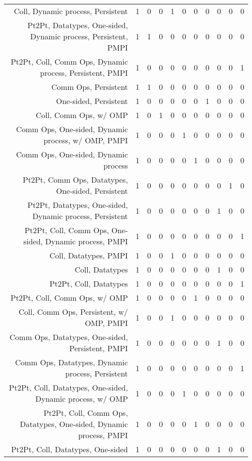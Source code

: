 {\begin{landscape}
\begin{longtable}[htb]{r|c|c|c|c|c|c|c|c|c|c}
{Coll, Dynamic process, Persistent} & 1 & 0 & 0 & 1 & 0 & 0 & 0 & 0 & 0 & 0 \\%
{Pt2Pt, Datatypes, One-sided, Dynamic process, Persistent, PMPI} & 1 & 1 & 0 & 0 & 0 & 0 & 0 & 0 & 0 & 0 \\%
{Pt2Pt, Coll, Comm Ops, Dynamic process, Persistent, PMPI} & 1 & 0 & 0 & 0 & 0 & 0 & 0 & 0 & 0 & 1 \\%
{Comm Ops, Persistent} & 1 & 1 & 0 & 0 & 0 & 0 & 0 & 0 & 0 & 0 \\%
{One-sided, Persistent} & 1 & 0 & 0 & 0 & 0 & 0 & 1 & 0 & 0 & 0 \\%
{Coll, Comm Ops, w/ OMP} & 1 & 0 & 1 & 0 & 0 & 0 & 0 & 0 & 0 & 0 \\%
{Comm Ops, One-sided, Dynamic process, w/ OMP, PMPI} & 1 & 0 & 0 & 0 & 1 & 0 & 0 & 0 & 0 & 0 \\%
{Comm Ops, One-sided, Dynamic process} & 1 & 0 & 0 & 0 & 0 & 1 & 0 & 0 & 0 & 0 \\%
{Pt2Pt, Comm Ops, Datatypes, One-sided, Persistent} & 1 & 0 & 0 & 0 & 0 & 0 & 0 & 0 & 1 & 0 \\%
{Pt2Pt, Datatypes, One-sided, Dynamic process, Persistent} & 1 & 0 & 0 & 0 & 0 & 0 & 0 & 1 & 0 & 0 \\%
{Pt2Pt, Coll, Comm Ops, One-sided, Dynamic process, PMPI} & 1 & 0 & 0 & 0 & 0 & 0 & 0 & 0 & 0 & 1 \\%
{Coll, Datatypes, PMPI} & 1 & 0 & 0 & 1 & 0 & 0 & 0 & 0 & 0 & 0 \\%
{Coll, Datatypes} & 1 & 0 & 0 & 0 & 0 & 0 & 0 & 1 & 0 & 0 \\%
{Pt2Pt, Coll, Datatypes} & 1 & 0 & 0 & 0 & 0 & 0 & 0 & 0 & 0 & 1 \\%
{Pt2Pt, Coll, Comm Ops, w/ OMP} & 1 & 0 & 0 & 0 & 0 & 1 & 0 & 0 & 0 & 0 \\%
{Coll, Comm Ops, Persistent, w/ OMP, PMPI} & 1 & 0 & 0 & 1 & 0 & 0 & 0 & 0 & 0 & 0 \\%
{Comm Ops, Datatypes, One-sided, Persistent, PMPI} & 1 & 0 & 0 & 0 & 0 & 0 & 0 & 1 & 0 & 0 \\%
{Comm Ops, Datatypes, Dynamic process, Persistent} & 1 & 0 & 0 & 0 & 0 & 0 & 0 & 0 & 0 & 1 \\%
{Pt2Pt, Coll, Datatypes, One-sided, Dynamic process, w/ OMP} & 1 & 0 & 0 & 0 & 1 & 0 & 0 & 0 & 0 & 0 \\%
{Pt2Pt, Coll, Comm Ops, Datatypes, One-sided, Dynamic process, PMPI} & 1 & 0 & 0 & 0 & 0 & 1 & 0 & 0 & 0 & 0 \\%
{Pt2Pt, Coll, Datatypes, One-sided} & 1 & 0 & 0 & 0 & 0 & 0 & 0 & 1 & 0 & 0 \\%

\end{longtable}
\end{landscape}}
